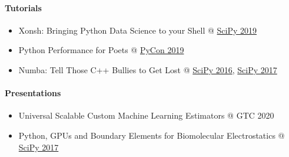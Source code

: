 \hypertarget{tutorials}{%
\paragraph{Tutorials}\label{tutorials}}

\begin{itemize}
\tightlist
\item
  Xonsh: Bringing Python Data Science to your Shell @
  \href{https://www.youtube.com/watch?v=ujo9sbqHFqw}{SciPy 2019}
\item
  Python Performance for Poets @
  \href{https://us.pycon.org/2019/schedule/presentation/366/}{PyCon
  2019}
\item
  Numba: Tell Those C++ Bullies to Get Lost @
  \href{https://www.youtube.com/watch?v=SzBi3xdEF2Y}{SciPy 2016},
  \href{https://www.youtube.com/watch?v=1AwG0T4gaO0}{SciPy 2017}
\end{itemize}

\hypertarget{presentations}{%
\paragraph{Presentations}\label{presentations}}

\begin{itemize}
\tightlist
\item
  Universal Scalable Custom Machine Learning Estimators @ GTC 2020
\item
  Python, GPUs and Boundary Elements for Biomolecular Electrostatics @
  \href{https://www.youtube.com/watch?v=Jpg0L_7-mlI}{SciPy 2017}
\end{itemize}
